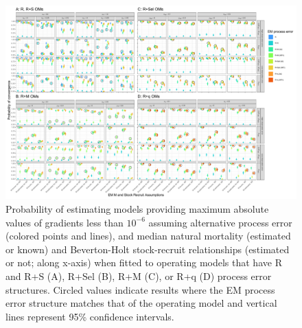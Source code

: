 \documentclass[
  12pt,
]{article}
\begin{document}
\begin{landscape}
\begin{figure}
\begin{center}
\includegraphics{type_3_convergence_plots}
\end{center}
\caption{Probability of estimating models providing maximum absolute values of gradients less than $10^{-6}$ assuming alternative process error (colored points and lines), and median natural mortality (estimated or known) and Beverton-Holt stock-recruit relationships (estimated or not; along x-axis) when fitted to operating models that have R and R+S (A), R+Sel (B), R+M (C), or R+q (D) process error structures. Circled values indicate results where the EM process error structure matches that of the operating model and vertical lines represent 95\% confidence intervals.}\label{gradient_convergence}
\end{figure}
\end{landscape}
\end{document}
